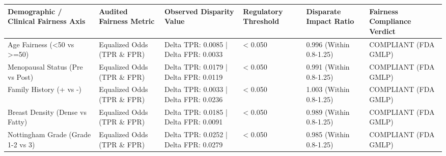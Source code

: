 \begin{tabular}{llllll}
\toprule
Demographic / Clinical Fairness Axis & Audited Fairness Metric & Observed Disparity Value & Regulatory Threshold & Disparate Impact Ratio & Fairness Compliance Verdict \\
\midrule
Age Fairness (<50 vs >=50) & Equalized Odds (TPR \& FPR) & Delta TPR: 0.0085 | Delta FPR: 0.0033 & < 0.050 & 0.996 (Within 0.8-1.25) & COMPLIANT (FDA GMLP) \\
Menopausal Status (Pre vs Post) & Equalized Odds (TPR \& FPR) & Delta TPR: 0.0179 | Delta FPR: 0.0119 & < 0.050 & 0.991 (Within 0.8-1.25) & COMPLIANT (FDA GMLP) \\
Family History (+ vs -) & Equalized Odds (TPR \& FPR) & Delta TPR: 0.0033 | Delta FPR: 0.0236 & < 0.050 & 1.003 (Within 0.8-1.25) & COMPLIANT (FDA GMLP) \\
Breast Density (Dense vs Fatty) & Equalized Odds (TPR \& FPR) & Delta TPR: 0.0185 | Delta FPR: 0.0091 & < 0.050 & 0.989 (Within 0.8-1.25) & COMPLIANT (FDA GMLP) \\
Nottingham Grade (Grade 1-2 vs 3) & Equalized Odds (TPR \& FPR) & Delta TPR: 0.0252 | Delta FPR: 0.0279 & < 0.050 & 0.985 (Within 0.8-1.25) & COMPLIANT (FDA GMLP) \\
\bottomrule
\end{tabular}
